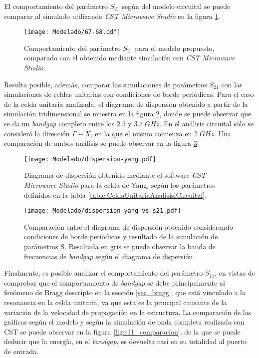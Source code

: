 El comportamiento del parámetro $S_{21}$ según del modelo circuital se puede comparar al simulado utilizando \textit{CST Microwave Studio} en la figura \ref{fig:s12_modelo_final}.

\begin{figure}[h]
	\centering
	\texttt{[image: Modelado/67-68.pdf]}
	\caption{Comportamiento del parámetro $S_{21}$ para el modelo propuesto, comparado con el obtenido mediante simulación con \textit{CST Microwave Studio}.}
	\label{fig:s12_modelo_final}
\end{figure}

Resulta posible, además, comparar las simulaciones de parámetros $S_{21}$ con las simulaciones de celdas unitarias con condiciones de borde periódicas. Para el caso de la celda unitaria analizada, el diagrama de dispersión obtenido a partir de la simulación tridimensional se muestra en la figura \ref{fig:diag-disp-yang-cst}, donde se puede observar que se da un \textit{bandgap} completo entre los $2.5$ y $3.7\;GHz$. En el análisis circuital sólo se consideró la dirección $\Gamma-X$, en la que el mismo comienza en $2\; GHz$. Una comparación de ambos análisis se puede observar en la figura \ref{fig:diag-disp-yang-vs-s21}.

\begin{figure}[h]
	\centering
	\texttt{[image: Modelado/dispersion-yang.pdf]}
	\caption{Diagrama de dispersión obtenido mediante el software \textit{CST Microwave Studio} para la celda de Yang, según los parámetros definidos en la tabla \ref{table:CeldaUnitariaAnalisisiCircuital}.}
	\label{fig:diag-disp-yang-cst}
\end{figure}

\begin{figure}[h]
	\centering
	\texttt{[image: Modelado/dispersion-yang-vs-s21.pdf]}
	\caption{Comparación entre el diagrama de dispersión obtenido considerando condiciones de borde periódicas y resultado de la simulación de parámetros S. Resaltada en gris se puede observar la banda de frecuencias de \textit{bandgap} según el diagrama de dispersión.}
	\label{fig:diag-disp-yang-vs-s21}
\end{figure}

Finalmente, es posible analizar el comportamiento del parámetro $S_{11}$, en vistas de comprobar que el comportamiento de \textit{bandgap} se debe principalmente al fenómeno de Bragg descripto en la sección \ref{sec_bragg}, que está vinculado a la resonancia en la celda unitaria, ya que esta es la principal causante de la variación de la velocidad de propagación en la estructura. La comparación de las gráficas según el modelo y según la simulación de onda completa realizada con CST se puede observar en la figura \ref{fig:s11_comparacion}, de la que se puede deducir que la energía, en el \textit{bandgap}, es devuelta casi en su totalidad al puerto de entrada.

